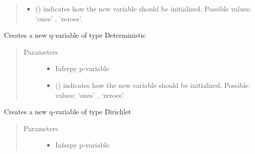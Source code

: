 \documentclass[letterpaper,10pt,english]{sphinxmanual}
\begin{document}
\begin{fulllineitems}
\begin{fulllineitems}
\begin{quote}
\begin{description}
\begin{itemize}
\item {} 
 () \textendash{} indicates how the new variable should be initialized. Possible values: ‘ones’ , ‘zeroes’.

\end{itemize}

\end{description}\end{quote}

\end{fulllineitems}


\begin{fulllineitems}
\label{\detokenize{modules/inferpy.inferences:inferpy.inferences.qmodel.Qmodel.Deterministic}}
Creates a new q-variable of type Deterministic
\begin{quote}\begin{description}
\item[{Parameters}] \leavevmode\begin{itemize}
\item {} 
 \textendash{} Inferpy p-variable

\item {} 
 () \textendash{} indicates how the new variable should be initialized. Possible values: ‘ones’ , ‘zeroes’.

\end{itemize}

\end{description}\end{quote}

\end{fulllineitems}


\begin{fulllineitems}
\label{\detokenize{modules/inferpy.inferences:inferpy.inferences.qmodel.Qmodel.Dirichlet}}
Creates a new q-variable of type Dirichlet
\begin{quote}\begin{description}
\item[{Parameters}] \leavevmode\begin{itemize}
\item {} 
 \textendash{} Inferpy p-variable


\end{itemize}
\end{description}
\end{quote}
\end{fulllineitems}
\end{fulllineitems}
\end{document}
